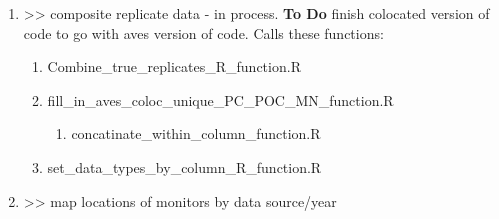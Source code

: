 \begin{enumerate}[nolistsep]
\begin{enumerate}
\end{enumerate}




\item {} >> composite replicate data - in process. \textbf{To Do} finish colocated version of code to go with aves version of code. Calls these functions:
  \begin{enumerate}
  \item Combine\_true\_replicates\_R\_function.R
  \item fill\_in\_aves\_coloc\_unique\_PC\_POC\_MN\_function.R
    \begin{enumerate}
    \item concatinate\_within\_column\_function.R
    \end{enumerate}
  \item set\_data\_types\_by\_column\_R\_function.R
  \end{enumerate}
\item {} >> map locations of monitors by data source/year

\end{enumerate}

